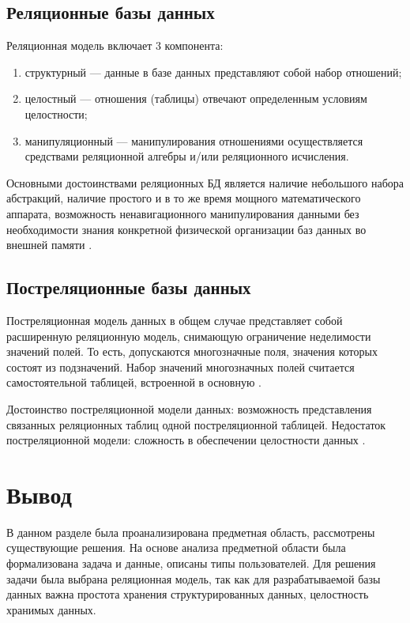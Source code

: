 \subsection{Реляционные базы данных}

Реляционная модель включает 3 компонента: 

\begin{enumerate}[label={\arabic*)}]
	\item структурный --- данные в базе данных представляют собой набор отношений;
	\item целостный --- отношения (таблицы) отвечают определенным условиям целостности;
	\item манипуляционный --- манипулирования отношениями осуществляется средствами реляционной алгебры и/или реляционного исчисления.
\end{enumerate}

Основными достоинствами реляционных БД является наличие небольшого набора абстракций, наличие простого и в то же время мощного математического аппарата, возможность ненавигационного манипулирования данными без необходимости знания конкретной физической организации баз данных во внешней памяти \cite{info_db_kuznecov}.

\clearpage

\subsection{Постреляционные базы данных}

Постреляционная модель данных в общем случае представляет собой расширенную реляционную модель, снимающую ограничение неделимости значений полей. То есть, допускаются многозначные поля, значения которых состоят из подзначений. Набор значений многозначных полей считается самостоятельной таблицей, встроенной в основную \cite{info_db_sopchenko}.

Достоинство постреляционной модели данных: возможность представления связанных реляционных таблиц одной постреляционной таблицей.  Недостаток постреляционной модели: сложность в обеспечении целостности данных \cite{info_db_sopchenko}.
                         
\section*{Вывод} 

В данном разделе была проанализирована предметная область, рассмотрены существующие решения. На основе анализа предметной области была формализована задача и данные, описаны типы пользователей. Для решения задачи была выбрана реляционная модель, так как для разрабатываемой базы данных важна простота хранения структурированных данных, целостность хранимых данных.
